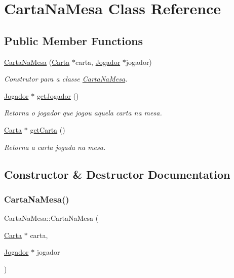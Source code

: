 \hypertarget{class_carta_na_mesa}{}\section{Carta\+Na\+Mesa Class Reference}
\label{class_carta_na_mesa}
\subsection*{Public Member Functions}
\begin{DoxyCompactItemize}
\item 
\mbox{\hyperlink{class_carta_na_mesa_a093eb23ca115e380251240752ebe795a}{Carta\+Na\+Mesa}} (\mbox{\hyperlink{class_carta}{Carta}} $\ast$carta, \mbox{\hyperlink{class_jogador}{Jogador}} $\ast$jogador)
\begin{DoxyCompactList}\small\item\em Construtor para a classe \mbox{\hyperlink{class_carta_na_mesa}{Carta\+Na\+Mesa}}. \end{DoxyCompactList}\item 
\mbox{\hyperlink{class_jogador}{Jogador}} $\ast$ \mbox{\hyperlink{class_carta_na_mesa_a2dd1806034ff0ca5cb9c02a28bee709f}{get\+Jogador}} ()
\begin{DoxyCompactList}\small\item\em Retorna o jogador que jogou aquela carta na mesa. \end{DoxyCompactList}\item 
\mbox{\hyperlink{class_carta}{Carta}} $\ast$ \mbox{\hyperlink{class_carta_na_mesa_a2019e0269144f552f218ae795b7ab599}{get\+Carta}} ()
\begin{DoxyCompactList}\small\item\em Retorna a carta jogada na mesa. \end{DoxyCompactList}\end{DoxyCompactItemize}


\subsection{Constructor \& Destructor Documentation}
\mbox{\label{class_carta_na_mesa_a093eb23ca115e380251240752ebe795a}} 
\subsubsection{\texorpdfstring{CartaNaMesa()}{CartaNaMesa()}}
{\footnotesize\ttfamily Carta\+Na\+Mesa\+::\+Carta\+Na\+Mesa (\begin{DoxyParamCaption}\item[{\mbox{\hyperlink{class_carta}{Carta}} $\ast$}]{carta,  }\item[{\mbox{\hyperlink{class_jogador}{Jogador}} $\ast$}]{jogador }\end{DoxyParamCaption})}



